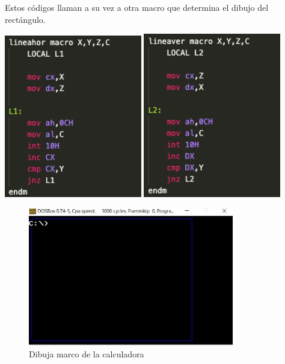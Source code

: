 \documentclass[letterpaper,12 pt,titlepage]{article}
\begin{document}
    Estos códigos llaman a su vez a otra macro que determina el dibujo del rectángulo.

    \begin{center}
        \includegraphics[width=0.45\textwidth]{img/08.png}
        \includegraphics[width=0.45\textwidth]{img/09.png}
    \end{center}

    \begin{figure}[H]
    \centering
    \includegraphics[width=0.8\textwidth]{img/10.png}
    \caption{Dibuja marco de la calculadora}
    \end{figure}
\end{document}
